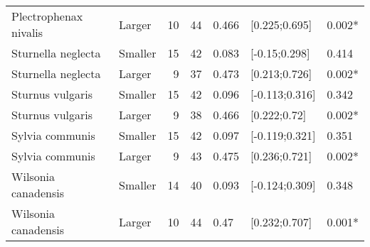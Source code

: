 \documentclass{article}
\begin{document}
\begin{table}[H]
\begin{tabular}{llrrlll}
  Plectrophenax nivalis & Larger & 10 & 44 & 0.466 & [0.225;0.695] & 0.002* \\ 
  Sturnella neglecta & Smaller & 15 & 42 & 0.083 & [-0.15;0.298] & 0.414 \\ 
  Sturnella neglecta & Larger & 9 & 37 & 0.473 & [0.213;0.726] & 0.002* \\ 
  Sturnus vulgaris & Smaller & 15 & 42 & 0.096 & [-0.113;0.316] & 0.342 \\ 
  Sturnus vulgaris & Larger & 9 & 38 & 0.466 & [0.222;0.72] & 0.002* \\ 
  Sylvia communis & Smaller & 15 & 42 & 0.097 & [-0.119;0.321] & 0.351 \\ 
  Sylvia communis & Larger & 9 & 43 & 0.475 & [0.236;0.721] & 0.002* \\ 
  Wilsonia canadensis & Smaller & 14 & 40 & 0.093 & [-0.124;0.309] & 0.348 \\ 
  Wilsonia canadensis & Larger & 10 & 44 & 0.47 & [0.232;0.707] & 0.001* \\ 
  \hline
  \end{tabular}
  \end{table}
\end{document}
